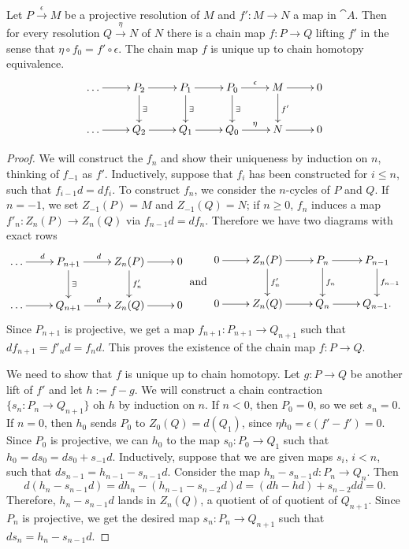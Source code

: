 \begin{theorem}
	Let $P\overset{\epsilon}{\longrightarrow} M$ be a projective resolution of $M$ and $f':M\rightarrow N$ a map in $\cat{A}$. Then for every resolution $Q\overset{\eta}{\rightarrow} N$ of $N$ there is a chain map $f:P\rightarrow Q$ lifting $f'$ in the sense that $\eta\circ f_0=f'\circ\epsilon$. The chain map $f$ is unique up to chain homotopy equivalence.
	\begin{align*}
		\xymatrix{
			\dots \ar[r] &P_2 \ar[r] \ar[d]^{\exists} &P_1 \ar[r] \ar[d]^{\exists} &P_0 \ar[r]^{\epsilon} \ar[d]^{\exists} &M \ar[r] \ar[d]^{f'} &0 \\
			\dots \ar[r] &Q_2 \ar[r] &Q_1 \ar[r] &Q_0 \ar[r]^{\eta} &N \ar[r] &0 
		}
	\end{align*}
\end{theorem}

\begin{proof}
	We will construct the $f_n$ and show their uniqueness by induction on $n$, thinking of $f_{-1}$ as $f'$.
	Inductively, suppose that $f_i$ has been constructed for $i\leq n$, such that $f_{i-1}d=df_i$.
	To construct $f_n$, we consider the $n$-cycles of $P$ and $Q$.
	If $n=-1$, we set $Z_{-1}(P) = M$ and $Z_{-1}(Q) = N$; if $n \geq 0$, $f_n$ induces a map $f'_n: Z_n(P) \rightarrow Z_n(Q)$ via $f_{n-1}d=df_n$.
	Therefore we have two diagrams with exact rows
	\[
		\vcenter{\xymatrix{
				\dots \ar[r]^d &P_{n+1} \ar[r]^d \ar[d]^{\exists} &Z_n(P) \ar[r] \ar[d]^{f'_n} &0 \\
				\dots \ar[r] &Q_{n+1} \ar[r]^d &Z_n(Q) \ar[r] &0
		}}
		\text{ and }
		\vcenter{\xymatrix{
				0 \ar[r] &Z_n(P) \ar[r] \ar[d]^{f'_n} &P_n \ar[r] \ar[d]^{f_n} &P_{n-1} \ar[d]^{f_{n-1}} \\
				0 \ar[r] &Z_n(Q) \ar[r] &Q_n \ar[r] &Q_{n-1}.
	}}
	\]
	Since $P_{n+1}$ is projective, we get a map $f_{n+1}: P_{n+1} \rightarrow Q_{n+1}$ such that $df_{n+1} = f'_nd = f_nd$.
	This proves the existence of the chain map $f: P \rightarrow Q$.
	
	We need to show that $f$ is unique up to chain homotopy.
	Let $g: P \rightarrow Q$ be another lift of $f'$ and let $h := f - g$.
	We will construct a chain contraction $\{s_n: P_n \rightarrow Q_{n+1}\}$ oh $h$ by induction on $n$.
	If $n<0$, then $P_0 = 0$, so we set $s_n = 0$.
	If $n=0$, then $h_0$ sends $P_0$ to $Z_0(Q)=d(Q_1)$, since $\eta h_0 = \epsilon(f' - f') = 0$.
	Since $P_0$ is projective, we can $h_0$ to the map $s_0: P_0 \rightarrow Q_1$ such that $h_0 = d s_0 = d s_0 + s_{-1} d$.
	Inductively, suppose that we are given maps $s_i$, $i<n$, such that $d s_{n-1} = h_{n-1} - s_{n-1} d$.
	Consider the map $h_n - s_{n-1} d: P_n \rightarrow Q_n$.
	Then
	\[d(h_n - s_{n-1} d) = d h_n - (h_{n-1} - s_{n-2} d) d = (dh - hd) + s_{n-2} d d = 0.\]
	Therefore, $h_n - s_{n-1}d$ lands in $Z_n(Q)$, a quotient of of quotient of $Q_{n+1}$.
	Since $P_n$ is projective, we get the desired map $s_n: P_n \rightarrow Q_{n+1}$ such that $d s_n = h_n - s_{n-1} d$.
\end{proof}

